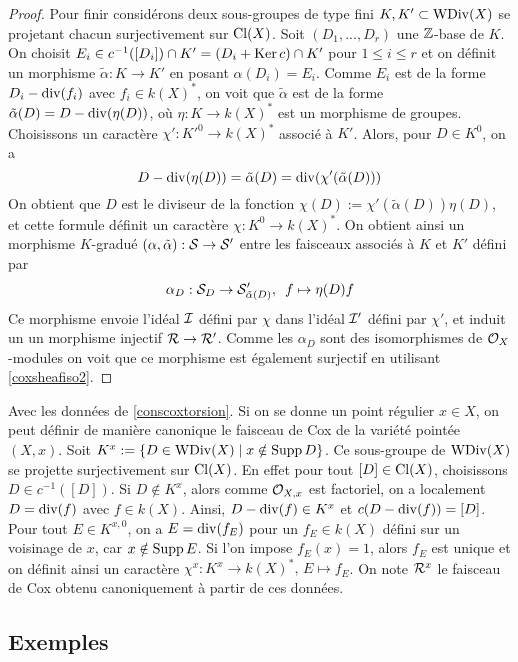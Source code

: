 \begin{proof}
Pour finir considérons deux sous-groupes de type fini $K,K'\subset \operatorname{WDiv}(X)$ se projetant chacun surjectivement sur $\operatorname{Cl}(X)$. Soit $(D_1,...,D_r)$ une $\mathbb{Z}$-base de $K$. On choisit $E_i\in c^{-1}([D_i])\cap K'=(D_i+\operatorname{Ker} c)\cap K'$ pour $1\leq i\leq r$ et on définit un morphisme $\tilde{\alpha}:K\rightarrow K'$ en posant $\alpha(D_i)=E_i$. Comme $E_i$ est de la forme $D_i-\operatorname{div}(f_i)$ avec $f_i\in k(X)^*$, on voit que $\tilde{\alpha}$ est de la forme $\tilde{\alpha}(D)=D-\operatorname{div}(\eta(D))$, où $\eta:K\rightarrow k(X)^*$ est un morphisme de groupes. Choisissons un caractère $\chi':K'^0\rightarrow k(X)^*$ associé à $K'$. Alors, pour $D\in K^0$, on a
$$D-\operatorname{div}(\eta(D))=\tilde{\alpha}(D)=\operatorname{div}(\chi'(\tilde{\alpha}(D)))$$
On obtient que $D$ est le diviseur de la fonction $\chi(D):=\chi'(\tilde{\alpha}(D))\eta(D)$, et cette formule définit un caractère $\chi:K^0\rightarrow k(X)^*$. On obtient ainsi un morphisme $K$-gradué $(\alpha,\tilde{\alpha}):\mathcal{S}\rightarrow \mathcal{S}'$ entre les faisceaux associés à $K$ et $K'$ défini par
$$\alpha_D:\mathcal{S}_D\rightarrow \mathcal{S}'_{\tilde{\alpha}(D)},\,\,\, f\mapsto\eta(D)f$$
Ce morphisme envoie l'idéal $\mathcal{I}$ défini par $\chi$ dans l'idéal $\mathcal{I}'$ défini par $\chi'$, et induit un un morphisme injectif $\mathcal{R}\rightarrow \mathcal{R}'$. Comme les $\alpha_D$ sont des isomorphismes de $\mathcal{O}_X$-modules on voit que ce morphisme est également surjectif en utilisant \ref{coxsheafiso2}.
\end{proof}

\begin{rem}
Avec les données de \ref{conscoxtorsion}. Si on se donne un point régulier $x\in X$, on peut définir de manière canonique le faisceau de Cox de la variété pointée $(X, x)$. Soit $K^x:=\lbrace D\in\operatorname{WDiv}(X)\mid x\notin \operatorname{Supp} D\rbrace$.  Ce sous-groupe de $\operatorname{WDiv}(X)$ se projette surjectivement sur $\operatorname{Cl}(X)$. En effet pour tout $[D]\in \operatorname{Cl}(X)$, choisissons $D\in c^{-1}([D])$. Si $D\notin K^x$, alors comme $\mathcal{O}_{X,x}$ est factoriel, on a localement $D=\operatorname{div}(f)$ avec $f\in k(X)$. Ainsi, $D-\operatorname{div}(f)\in K^x$ et $c(D-\operatorname{div}(f)) =[D]$. Pour tout $E\in K^{x,0}$, on a $E=\operatorname{div}(f_E)$ pour un $f_E\in k(X)$ défini sur un voisinage de $x$, car $x\notin \operatorname{Supp} E$. Si l'on impose $f_E(x)=1$, alors $f_E$ est unique et on définit ainsi un caractère $\chi^x:K^x\rightarrow k(X)^*,\,E\mapsto f_E$. On note $\mathcal{R}^x$ le faisceau de Cox obtenu canoniquement à partir de ces données.
\end{rem}

\subsection{Exemples}

